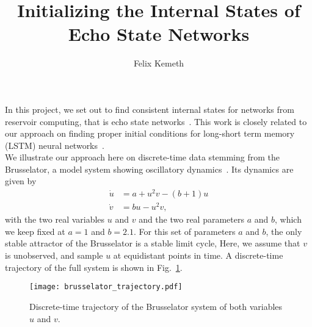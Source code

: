 \documentclass{article}
\author{Felix Kemeth}
\title{Initializing the Internal States of Echo State Networks}
\begin{document}
\maketitle

In this project, we set out to find consistent internal states for networks from reservoir computing, that is echo state networks~\cite{jaeger01_the_echo_state,
  yildiz12_re_visit_echo_state_proper,
  lu18_attrac_recon_by_machin_learn,
  tanaka19_recen_advan_physic_reser_comput}.
This work is closely related to our approach on finding proper initial conditions for
long-short term memory (LSTM) neural networks~\cite{kemeth2021initializing}.\\
We illustrate our approach here on discrete-time data stemming from the Brusselator,
a model system showing oscillatory dynamics~\cite{kondepudi14_brusselator_chapter}.
Its dynamics are given by
\begin{align}
    \dot{u} &= a + u^2v - (b+1)u\label{eq_:1a}\tag{1a}\\
    \dot{v} &= bu - u^2v,\label{eq_:1b}\tag{1b}
\end{align}
with the two real variables $u$ and $v$ and the two real parameters $a$ and $b$, which we keep fixed at $a=1$ and $b=2.1$.
For this set of parameters $a$ and $b$,
the only stable attractor of the Brusselator is a stable limit cycle,
Here, we assume that $v$ is unobserved, and sample $u$ at equidistant points in time.
A discrete-time trajectory of the full system is shown in Fig.~\ref{fig:brusselator}.

\begin{figure}[ht]
  \centering
  \texttt{[image: brusselator\_trajectory.pdf]}
  \caption{Discrete-time trajectory of the Brusselator system of both variables $u$ and $v$.}
  \label{fig:brusselator}
\end{figure}
\end{document}
